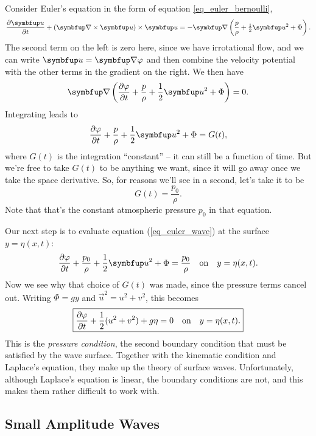 Consider Euler's equation in the form of equation \ref{eq_euler_bernoulli},
\[
\frac{\partial \uu}{\partial t} + (\curl \uu ) \times \uu = -\grad \left( \frac{p}{\rho} + \tfrac{1}{2} \uu^2 + \Phi \right).
\]
The second term on the left is zero here, since we have irrotational flow, and we can write $\vec{u} = \grad \varphi$ and then combine the velocity potential with the other terms in the gradient on the right.  We then have
\[
\grad \left( \dfdx{\varphi}{t} + \frac{p}{\rho} + \frac{1}{2} \vec{u}^2 + \Phi \right) = 0.
\]
Integrating leads to
\begin{equation}
\label{eq_euler_wave}
\dfdx{\varphi}{t} + \frac{p}{\rho} + \frac{1}{2} \vec{u}^2 + \Phi = G(t),
\end{equation}
where $G(t)$ is the integration ``constant'' -- it can still be a function of time.  But we're free to take $G(t)$ to be anything we want, since it will go away once we take the space derivative. So, for reasons we'll see in a second, let's take it to be
\begin{equation}
G(t) = \frac{p_0}{\rho}.
\end{equation}
Note that that's the constant atmospheric pressure $p_0$ in that equation.

Our next step is to evaluate equation (\ref{eq_euler_wave}) at the surface $y = \eta(x, t)$:
\begin{equation}
\label{eq_pressure_surface}
\dfdx{\varphi}{t} + \frac{p_0}{\rho} + \frac{1}{2} \vec{u}^2 + \Phi = \frac{p_0}{\rho} \quad \text{on} \quad y = \eta(x, t).
\end{equation}
Now we see why that choice of $G(t)$ was made, since the pressure terms cancel out.  Writing $\Phi = gy$ and $\vec{u}^2 = u^2 + v^2$, this becomes
\begin{equation}
\label{eq_pressure_cond}
\boxed{
\frac{\partial {\varphi}}{\partial {t}} +  \frac{1}{2}(u^2 + v^2) + g\eta = 0 \quad \text{on} \quad y = \eta(x, t).
}
\end{equation}
This is the \emph{pressure condition}, the second boundary condition that must be satisfied by the wave surface.  Together with the kinematic condition and Laplace's equation, they make up the theory of surface waves.  Unfortunately, although Laplace's equation is linear, the boundary conditions are not, and this makes them rather difficult to work with.  



\subsection{Small Amplitude Waves}

